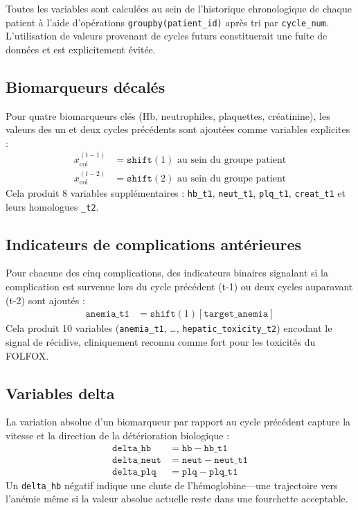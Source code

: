 \documentclass[12pt,a4paper]{report}
\begin{document}
Toutes les variables sont calculées au sein de l'historique chronologique de chaque patient à l'aide d'opérations \texttt{groupby(\textquotesingle patient\_id\textquotesingle)} après tri par \texttt{cycle\_num}. L'utilisation de valeurs provenant de cycles futurs constituerait une fuite de données et est explicitement évitée.

\subsection{Biomarqueurs décalés}

Pour quatre biomarqueurs clés (Hb, neutrophiles, plaquettes, créatinine), les valeurs des un et deux cycles précédents sont ajoutées comme variables explicites :
\begin{align}
  x^{(t-1)}_{\text{col}} &= \texttt{shift}(1) \text{ au sein du groupe patient} \\
  x^{(t-2)}_{\text{col}} &= \texttt{shift}(2) \text{ au sein du groupe patient}
\end{align}
Cela produit 8 variables supplémentaires : \texttt{hb\_t1}, \texttt{neut\_t1}, \texttt{plq\_t1}, \texttt{creat\_t1} et leurs homologues \texttt{\_t2}.

\subsection{Indicateurs de complications antérieures}

Pour chacune des cinq complications, des indicateurs binaires signalant si la complication est survenue lors du cycle précédent (t-1) ou deux cycles auparavant (t-2) sont ajoutés :
\begin{align}
  \texttt{anemia\_t1} &= \texttt{shift}(1)[\texttt{target\_anemia}]
\end{align}
Cela produit 10 variables (\texttt{anemia\_t1}, \ldots, \texttt{hepatic\_toxicity\_t2}) encodant le signal de récidive, cliniquement reconnu comme fort pour les toxicités du FOLFOX.

\subsection{Variables delta}

La variation absolue d'un biomarqueur par rapport au cycle précédent capture la vitesse et la direction de la détérioration biologique :
\begin{align}
  \texttt{delta\_hb}   &= \texttt{hb}   - \texttt{hb\_t1} \\
  \texttt{delta\_neut} &= \texttt{neut} - \texttt{neut\_t1} \\
  \texttt{delta\_plq}  &= \texttt{plq}  - \texttt{plq\_t1}
\end{align}
Un \texttt{delta\_hb} négatif indique une chute de l'hémoglobine---une trajectoire vers l'anémie même si la valeur absolue actuelle reste dans une fourchette acceptable.
\end{document}
